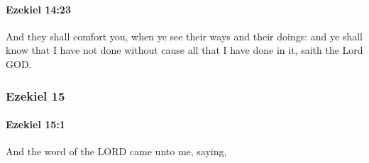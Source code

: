 		\paragraph{Ezekiel 14:23} %
			\label{EZEKIEL-14-23}

			And they shall comfort you, when ye see their ways and their doings: and ye shall know that I have not done without cause all that I have done in it, saith the Lord GOD.

	\subsubsection{Ezekiel 15} %
		\label{EZEKIEL-15}

		\paragraph{Ezekiel 15:1} %
			\label{EZEKIEL-15-1}

			And the word of the LORD came unto me, saying,

